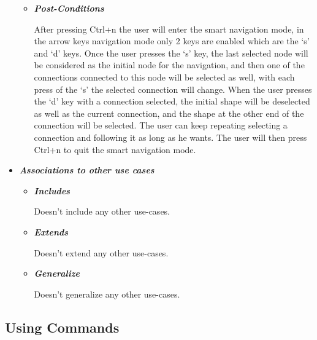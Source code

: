 \begin{itemize}
\begin{itemize}
\item {\bf \em Post-Conditions}
\par \noindent
After pressing Ctrl+n the user will enter the smart navigation mode, in the arrow keys navigation mode only 2 keys are enabled which are the `s' and `d' keys. Once the user presses the `s' key, the last selected node will be considered as the initial node for the navigation, and then one of the connections connected to this node will be selected as well, with each press of the `s' the selected connection will change. When the user presses the `d' key with a connection selected, the initial shape will be deselected as well as the current connection, and the shape at the other end of the connection will be selected. The user can keep repeating selecting a connection and following it as long as he wants. The user will then press Ctrl+n to quit the smart navigation mode.

\end{itemize}

\item {\bf \em Associations to other use cases}
\par \noindent

\begin{itemize}

\item {\bf \em Includes}
\par \noindent
Doesn't include any other use-cases.

\item {\bf \em Extends}
\par \noindent
Doesn't extend any other use-cases.

\item {\bf \em Generalize}
\par \noindent
Doesn't generalize any other use-cases.
\end{itemize}

\end{itemize}

\subsection{Using Commands}

